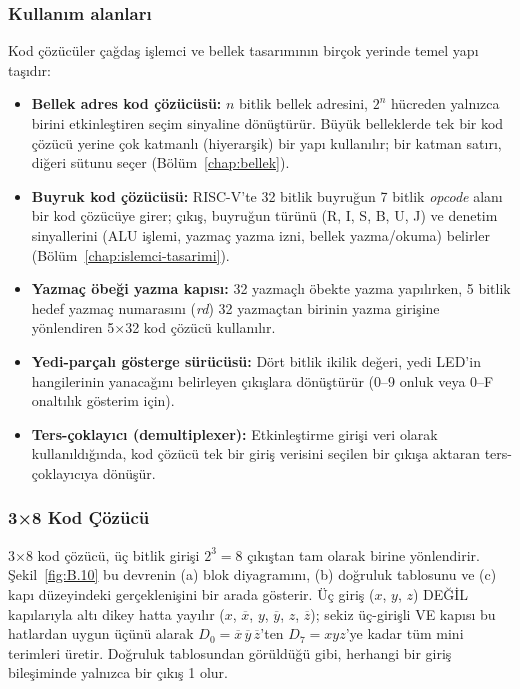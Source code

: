 \subsubsection{Kullanım alanları}
Kod çözücüler çağdaş işlemci ve bellek tasarımının birçok yerinde temel yapı taşıdır:
\begin{itemize}
  \item \textbf{Bellek adres kod çözücüsü:} $n$ bitlik bellek adresini, $2^n$ hücreden yalnızca birini etkinleştiren seçim sinyaline dönüştürür. Büyük belleklerde tek bir kod çözücü yerine çok katmanlı (hiyerarşik) bir yapı kullanılır; bir katman satırı, diğeri sütunu seçer (Bölüm~\ref{chap:bellek}).
  \item \textbf{Buyruk kod çözücüsü:} RISC-V'te 32 bitlik buyruğun 7 bitlik \emph{opcode} alanı bir kod çözücüye girer; çıkış, buyruğun türünü (R, I, S, B, U, J) ve denetim sinyallerini (ALU işlemi, yazmaç yazma izni, bellek yazma/okuma) belirler (Bölüm~\ref{chap:islemci-tasarimi}).
  \item \textbf{Yazmaç öbeği yazma kapısı:} 32 yazmaçlı öbekte yazma yapılırken, 5 bitlik hedef yazmaç numarasını (\emph{rd}) 32 yazmaçtan birinin yazma girişine yönlendiren 5×32 kod çözücü kullanılır.
  \item \textbf{Yedi-parçalı gösterge sürücüsü:} Dört bitlik ikilik değeri, yedi LED'in hangilerinin yanacağını belirleyen çıkışlara dönüştürür (0--9 onluk veya 0--F onaltılık gösterim için).
  \item \textbf{Ters-çoklayıcı (demultiplexer):} Etkinleştirme girişi veri olarak kullanıldığında, kod çözücü tek bir giriş verisini seçilen bir çıkışa aktaran ters-çoklayıcıya dönüşür.
\end{itemize}

\subsubsection{3×8 Kod Çözücü}
3×8 kod çözücü, üç bitlik girişi $2^3 = 8$ çıkıştan tam olarak birine yönlendirir. Şekil~\ref{fig:B.10} bu devrenin (a) blok diyagramını, (b) doğruluk tablosunu ve (c) kapı düzeyindeki gerçeklenişini bir arada gösterir. Üç giriş ($x$, $y$, $z$) DEĞİL kapılarıyla altı dikey hatta yayılır ($x$, $\overline{x}$, $y$, $\overline{y}$, $z$, $\overline{z}$); sekiz üç-girişli VE kapısı bu hatlardan uygun üçünü alarak $D_0 = \overline{x}\,\overline{y}\,\overline{z}$'ten $D_7 = xyz$'ye kadar tüm mini terimleri üretir. Doğruluk tablosundan görüldüğü gibi, herhangi bir giriş bileşiminde yalnızca bir çıkış 1 olur.


